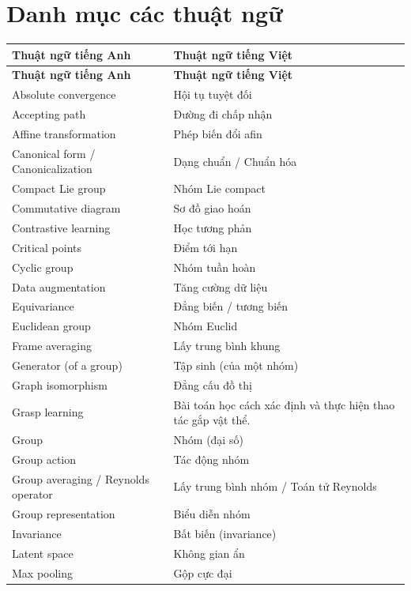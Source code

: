 \documentclass[oneside]{hcmus-report}
\theoremstyle{plain}
\theoremstyle{definition}
\begin{document}
\clearpage
{}

\section*{Danh mục các thuật ngữ}

\begin{longtable}{p{} p{}}
\textbf{Thuật ngữ tiếng Anh} & \textbf{Thuật ngữ tiếng Việt} \\
\hline
\endfirsthead
\textbf{Thuật ngữ tiếng Anh} & \textbf{Thuật ngữ tiếng Việt} \\
\hline
\endhead

Absolute convergence & Hội tụ tuyệt đối \\
Accepting path & Đường đi chấp nhận \\
Affine transformation & Phép biến đổi afin \\
Canonical form / Canonicalization & Dạng chuẩn / Chuẩn hóa \\
Compact Lie group & Nhóm Lie compact \\
Commutative diagram & Sơ đồ giao hoán \\
Contrastive learning & Học tương phản \\
Critical points & Điểm tới hạn \\
Cyclic group & Nhóm tuần hoàn \\
Data augmentation & Tăng cường dữ liệu \\
Equivariance & Đẳng biến / tương biến \\
Euclidean group & Nhóm Euclid \\
Frame averaging & Lấy trung bình khung \\
Generator (of a group) & Tập sinh (của một nhóm) \\
Graph isomorphism & Đẳng cấu đồ thị \\
Grasp learning & Bài toán học cách xác định và thực hiện thao tác gắp vật thể.\\
Group & Nhóm (đại số) \\
Group action & Tác động nhóm \\
Group averaging / Reynolds operator & Lấy trung bình nhóm / Toán tử Reynolds \\
Group representation & Biểu diễn nhóm \\
Invariance & Bất biến (invariance) \\
Latent space & Không gian ẩn \\
Max pooling & Gộp cực đại \\

\end{longtable}
\end{document}
